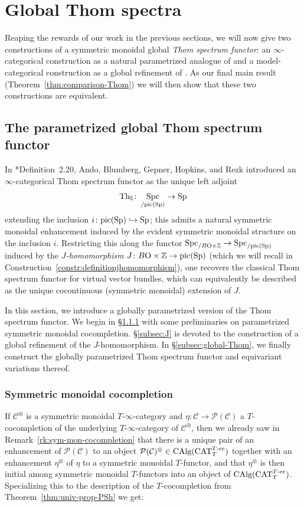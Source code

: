 \documentclass[reqno]{memo-l}
\theoremstyle{mythm}
\theoremstyle{definition}
\numberwithin{equation}{section}
\newcommand{\Cc}{{\mathcal{C}}}
\DeclareMathOperator{\Sp}{Sp}
\DeclareMathOperator{\Spc}{Spc}
\DeclareMathOperator{\CAT}{CAT}
\DeclareMathOperator{\CAlg}{\textup{CAlg}}
\newcommand{\Th}{{\textup{Th}}}
\newcommand{\pic}{\textup{pic}}
\newcommand{\BO}{B\textup{O}}
\begin{document}
\chapter{Global Thom spectra}
Reaping the rewards of our work in the previous sections, we will now give two constructions of a symmetric monoidal global \emph{Thom spectrum functor}: an $\infty$-categorical construction as a natural parametrized analogue of \cite{thom-oo} and a model-categorical construction as a global refinement of \cite{sagave-schlichtkrull-thom}. As our final main result (Theorem~\ref{thm:comparison-Thom}) we will then show that these two constructions are equivalent. 
\section{The parametrized global Thom spectrum functor}\label{sec:parametrized-thom}
In \cite{thom-oo}*{Definition~2.20}, Ando, Blumberg, Gepner, Hopkins, and Rezk introduced an $\infty$-categorical Thom spectrum functor as the unique left adjoint
\[
    \Th_{\mathbb S}\colon\Spc_{/\pic(\Sp)}\to\Sp
\]
extending the inclusion $i\colon\pic(\Sp)\hookrightarrow\Sp$; this admits a natural symmetric monoidal enhancement induced by the evident symmetric monoidal structure on the inclusion $i$.
Restricting this along the functor $\Spc_{/\BO\times\mathbb Z}\to\Spc_{/\pic(\Sp)}$ induced by the \emph{$J$-homomorphism} $J\colon\BO\times \mathbb Z\to \pic(\Sp)$ (which we will recall in Construction~\ref{constr:definitionjhomomorphism}), one recovers the classical Thom spectrum functor for virtual vector bundles, which can equivalently be described as the unique cocontinuous (symmetric monoidal) extension of $J$.

In this section, we introduce a globally parametrized version of the Thom spectrum functor. We begin in §\ref{subsec:slicecats} with some preliminaries on parametrized symmetric monoidal cocompletion. §\ref{subsec:J} is devoted to the construction of a global refinement of the $J$-homomorphism. In  §\ref{subsec:global-Thom}, we finally construct the globally parametrized Thom spectrum functor and equivariant variations thereof.

\subsection{Symmetric monoidal cocompletion}\label{subsec:slicecats}
If $\Cc^\otimes$ is a symmetric monoidal $T$-$\infty$-category and $\eta\colon\Cc\to\mathcal P(\Cc)$ a $T$-cocompletion of the underlying $T$-$\infty$-category of $\Cc^\otimes$, then we already saw in Remark~\ref{rk:sym-mon-cocompletion} that there is a unique pair of an enhancement of $\mathcal P(\Cc)$ to an object $\mathcal P(\Cc)^\otimes\in\CAlg(\CAT_T^\text{$T$-cc})$ together with an enhancement $\eta^\otimes$ of $\eta$ to a symmetric monoidal $T$-functor, and that $\eta^\otimes$ is then initial among symmetric monoidal $T$-functors into an object of $\CAlg(\CAT_T^\text{$T$-cc})$. 
Specializing this to the description of the $T$-cocompletion from Theorem~\ref{thm:univ-prop-PSh} we get:
\end{document}

